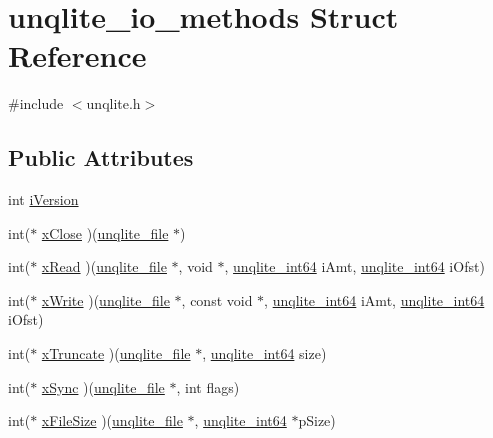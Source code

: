 \hypertarget{structunqlite__io__methods}{\section{unqlite\-\_\-io\-\_\-methods Struct Reference}
\label{d6/d9e/structunqlite__io__methods}
}


{\ttfamily \#include $<$unqlite.\-h$>$}

\subsection*{Public Attributes}
\begin{DoxyCompactItemize}
\item 
int \hyperlink{structunqlite__io__methods_ac468d05f4326d59d672dc8a9b889b6dc}{i\-Version}
\item 
int($\ast$ \hyperlink{structunqlite__io__methods_a2d7ee9eab774e16465184adcc9f860a2}{x\-Close} )(\hyperlink{structunqlite__file}{unqlite\-\_\-file} $\ast$)
\item 
int($\ast$ \hyperlink{structunqlite__io__methods_a591d297aaa1317f4d9af5b14d19c9fe3}{x\-Read} )(\hyperlink{structunqlite__file}{unqlite\-\_\-file} $\ast$, void $\ast$, \hyperlink{unqlite_8c_ae7dd2792142c2ec7874a56602b8f2bb8}{unqlite\-\_\-int64} i\-Amt, \hyperlink{unqlite_8c_ae7dd2792142c2ec7874a56602b8f2bb8}{unqlite\-\_\-int64} i\-Ofst)
\item 
int($\ast$ \hyperlink{structunqlite__io__methods_aa96c236a1c4722b48de0926763e89a4e}{x\-Write} )(\hyperlink{structunqlite__file}{unqlite\-\_\-file} $\ast$, const void $\ast$, \hyperlink{unqlite_8c_ae7dd2792142c2ec7874a56602b8f2bb8}{unqlite\-\_\-int64} i\-Amt, \hyperlink{unqlite_8c_ae7dd2792142c2ec7874a56602b8f2bb8}{unqlite\-\_\-int64} i\-Ofst)
\item 
int($\ast$ \hyperlink{structunqlite__io__methods_acbaf05b981262e90bf4bf0abb300bd01}{x\-Truncate} )(\hyperlink{structunqlite__file}{unqlite\-\_\-file} $\ast$, \hyperlink{unqlite_8c_ae7dd2792142c2ec7874a56602b8f2bb8}{unqlite\-\_\-int64} size)
\item 
int($\ast$ \hyperlink{structunqlite__io__methods_a8d76f86e674afc917e737a0fa8e4afb0}{x\-Sync} )(\hyperlink{structunqlite__file}{unqlite\-\_\-file} $\ast$, int flags)
\item 
int($\ast$ \hyperlink{structunqlite__io__methods_a6da907a6e006b7f4738eb870960efc8a}{x\-File\-Size} )(\hyperlink{structunqlite__file}{unqlite\-\_\-file} $\ast$, \hyperlink{unqlite_8c_ae7dd2792142c2ec7874a56602b8f2bb8}{unqlite\-\_\-int64} $\ast$p\-Size)

\end{DoxyCompactItemize}
